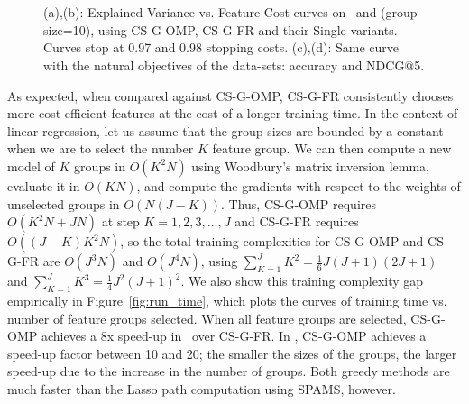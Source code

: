 

\begin{figure}[ht!]
\centering
{}
~

~

\caption{(a),(b): Explained Variance vs. Feature Cost curves on 
\Grain\, and \YahooLTR (group-size=10), 
using CS-G-OMP, CS-G-FR and their Single variants. Curves stop at 0.97 and 0.98 stopping costs. (c),(d): Same curve with the natural objectives of the data-sets: accuracy and NDCG@5.} 
\label{fig:selection_methods}
\end{figure}

As expected, when compared against CS-G-OMP, CS-G-FR consistently chooses more cost-efficient features at the cost of a longer training time.
In the context of linear regression, let us assume that the group sizes are 
bounded by a constant when we are to select the number 
$K$ feature group. We can then compute a new model of $K$  groups in $O(K^2N)$ using
Woodbury's matrix inversion lemma, evaluate it in $O(KN)$, and compute the gradients with respect to the weights of unselected groups in $O(N(J-K))$. Thus, CS-G-OMP requires $O(K^2N + JN)$ at step $K=1,2,3,..., J$ and CS-G-FR requires $O((J-K)K^2N)$, so the total training  complexities for CS-G-OMP and CS-G-FR are $O(J^3N)$ and $O(J^4N)$, using $\sum_{K=1}^J K^2 = \frac{1}{6}J(J+1)(2J+1)$ and $\sum _{K=1}^J K^3 = \frac{1}{4}J^2(J+1)^2$. 
We also show this training complexity gap empirically in Figure~\ref{fig:run_time}, which plots the curves of training time vs. number of feature groups selected. When all feature groups are selected, CS-G-OMP achieves a 8x speed-up in \Grain\ over CS-G-FR. In \YahooLTR, CS-G-OMP achieves a speed-up factor between 10 and 20; the smaller the sizes of the groups, the larger speed-up due to the increase in the number of groups. Both greedy methods are much faster than the Lasso path computation using SPAMS, however. 


